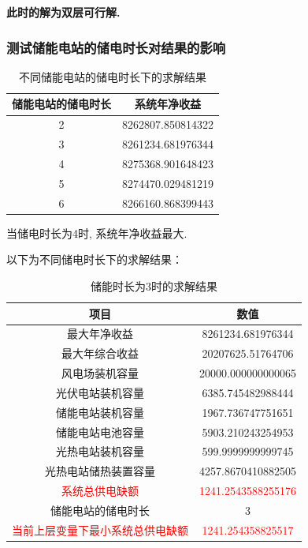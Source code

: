 \documentclass{article}
\begin{document}
\bf{此时的解为双层可行解}.

\subsubsection{测试储能电站的储电时长对结果的影响}
\begin{table}[H]
    \centering
    \caption{不同储能电站的储电时长下的求解结果}
    \label{tab:energy_system_data_2_6}
    \begin{tabular}{c|c}
        \toprule
        \textbf{储能电站的储电时长} & \textbf{系统年净收益} \\
        \midrule
        2 & 8262807.850814322 \\
        3 & 8261234.681976344 \\
        4 & 8275368.901648423 \\
        5 & 8274470.029481219 \\
        6 & 8266160.868399443 \\
        \bottomrule
    \end{tabular}
\end{table}

当储电时长为4时, 系统年净收益最大.

以下为不同储电时长下的求解结果：
\begin{table}[H]
    \centering
    \caption{储能时长为3时的求解结果}
    \label{tab:energy_system_data_3}
    \begin{tabular}{c|c}
        \toprule
        \textbf{项目} & \textbf{数值} \\
        \midrule
        最大年净收益 & 8261234.681976344 \\
        最大年综合收益 & 20207625.51764706 \\
        风电场装机容量 & 20000.000000000065 \\
        光伏电站装机容量 & 6385.745482988444 \\
        储能电站装机容量 & 1967.736747751651 \\
        储能电站电池容量 & 5903.210243254953 \\
        光热电站装机容量 & 599.9999999999745 \\
        光热电站储热装置容量 & 4257.8670410882505 \\
        \textcolor{red}{系统总供电缺额} & \textcolor{red}{1241.2543588255176} \\
        储能电站的储电时长 & 3 \\
        \textcolor{red}{当前上层变量下最小系统总供电缺额} & \textcolor{red}{1241.254358825517} \\
        \bottomrule
    \end{tabular}
\end{table}
\end{document}
